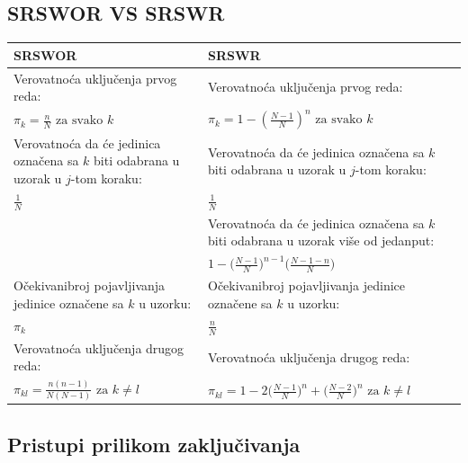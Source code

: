 \documentclass[10pt,a4paper,]{article}
\begin{document}
\subsection{SRSWOR VS SRSWR}
\begin{center}
\begin{tabular}{|p{6cm}|p{6cm}|}
\hline
SRSWOR & SRSWR \\
\hline
Verovatnoća uključenja prvog reda: 
&
Verovatnoća uključenja prvog reda: \\
$ \pi_k = \frac{n}{N} \text{ za svako } k$
&
$ \pi_k = 1 - (\frac{N-1}{N})^n \text{ za svako } k $
\\
\hline

Verovatnoća da će jedinica označena sa $k$ biti odabrana u uzorak u $j$-tom koraku:
&
Verovatnoća da će jedinica označena sa $k$ biti 
odabrana u uzorak u $j$-tom koraku:
\\

$\frac{1}{N}$
&
$\frac{1}{N}$\\
\hline

&
Verovatnoća da će jedinica označena sa $k$ biti odabrana u uzorak više od jedanput:\\

&
$1 - \big(\frac{N-1}{N}\big)^{n-1}\big(\frac{N-1-n}{N}\big)$ \\
\hline

Očekivanibroj pojavljivanja jedinice označene sa $k$ u uzorku:
&
Očekivanibroj pojavljivanja jedinice označene sa $k$ u uzorku: \\
$\pi_k$
&
$\frac{n}{N}$ \\
\hline
Verovatnoća uključenja drugog reda:
&
Verovatnoća uključenja drugog reda: \\

$\pi_{kl} = \frac{n(n-1)}{N(N-1)} \text{ za } k \neq l$
&
$\pi_{kl} = 1 - 2\big(\frac{N-1}{N}\big)^n 
+ \big(\frac{N-2}{N}\big)^n \text{ za } k \neq l$\\
\hline

\end{tabular}
\end{center}



\subsection{Pristupi prilikom zaključivanja}
\end{document}
